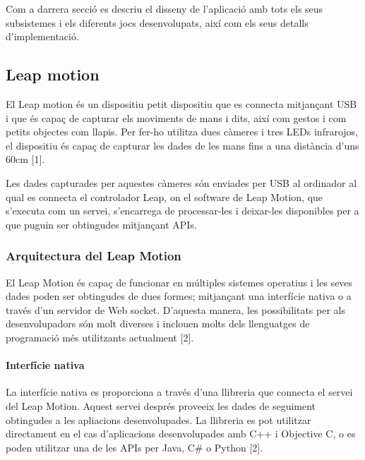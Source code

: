 \documentclass[12pt,a4paper,catalan]{article}
\begin{document}
	Com a darrera secció es descriu el disseny de l’aplicació amb tots els seus subsistemes i els diferents jocs desenvolupats, així com els seus detalls d’implementació.
	
	\subsection{Leap motion}
	El Leap motion és un dispositiu petit dispositiu que es connecta mitjançant USB i que és capaç de capturar els moviments de mans i dits, així com gestos i com petits objectes com llapis. Per fer-ho utilitza dues càmeres i tres LEDs infrarojos, el dispositiu és capaç de capturar les dades de les mans fins a una distància d’uns 60cm [1].
	
	Les dades capturades per aquestes càmeres són enviades per USB al ordinador al qual es connecta el controlador Leap, on el software de Leap Motion, que s’executa com un servei, s’encarrega de processar-les i deixar-les disponibles per a que puguin ser obtingudes mitjançant APIs.
	
	\subsubsection{Arquitectura del Leap Motion}
	El Leap Motion és capaç de funcionar en múltiples sistemes operatius i les seves dades poden ser obtingudes de dues formes; mitjançant una interfície nativa o a través d’un servidor de Web socket. D’aquesta manera, les possibilitats per als desenvolupadors són molt diverses i inclouen molts dels llenguatges de programació més utilitzants actualment [2].
	
	\paragraph{Interfície nativa}
	La interfície nativa es proporciona a través d’una llibreria que connecta el servei del Leap Motion. Aquest servei després proveeix les dades de seguiment obtingudes a les apliacions desenvolupades. La llibreria es pot utilitzar directament en el cas d’aplicacions desenvolupades amb C++ i Objective C, o es poden utilitzar una de les APIs per Java, C\# o Python [2].
	
\end{document}
